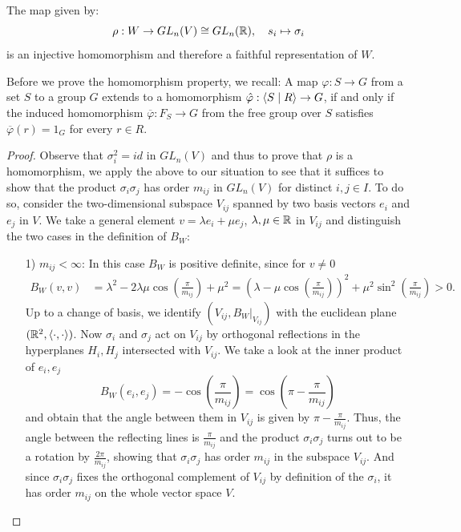 \begin{theorem}\label{thm:repr}
    The map given by:
    \[\rho : W \to GL_n(V) \cong GL_n(\mathbb{R}), \quad s_i \mapsto \sigma_i\]
    is an injective homomorphism and therefore a faithful representation of \(W\).
\end{theorem}
Before we prove the homomorphism property, we recall:
A map \(\varphi: S\to G\) from a set \(S\) to a group \(G\) extends to a homomorphism \(\Hat{\varphi}:\langle S\;\vert\;R\rangle\to G\), if and only if the induced homomorphism \(\overline{\varphi}:F_S \to G\) from the free group over \(S\) satisfies \(\overline{\varphi}(r) = 1_G\) for every \(r\in R\).
\begin{proof}
    Observe that \(\sigma_i^2 = id\) in \(GL_n(V)\) and thus to prove that \(\rho\) is a homomorphism, we apply the above to our situation to see that it suffices to show that the product \(\sigma_i\sigma_j\) has order \(m_{ij}\) in \(GL_n(V)\) for distinct \(i,j\in I\).
    To do so, consider the two-dimensional subspace \(V_{ij}\) spanned by two basis vectors \(e_i\) and \(e_j\) in \(V\).
    We take a general element \(v = \lambda e_i + \mu e_j\), \(\lambda,\mu\in\mathbb{R}\) in \(V_{ij}\) and distinguish the two cases in the definition of \(B_W\):
    \begin{itemize}
        \item[1)] \(m_{ij}<\infty\): In this case \(B_W\) is positive definite, since for \(v\neq 0\)
              \begin{align*}
                  B_W(v,v) & = \lambda^2 - 2\lambda\mu\cos\left(\frac{\pi}{m_{ij}}\right) + \mu^2
                  = \left( \lambda - \mu\cos\left( \frac{\pi}{m_{ij}} \right) \right)^2 + \mu^2\sin^2\left( \frac{\pi}{m_{ij}} \right) > 0.
              \end{align*}
              Up to a change of basis, we identify \((V_{ij}, B_W\vert_{V_{ij}})\) with the euclidean plane \((\mathbb{R}^2, \langle\cdot, \cdot\rangle)\).
              Now \(\sigma_i\) and \(\sigma_j\) act on \(V_{ij}\) by orthogonal reflections in the hyperplanes \(H_i, H_j\) intersected with \(V_{ij}\).
              We take a look at the inner product of \(e_i, e_j\)
              \[B_W(e_i, e_j) = -\cos\left(\frac{\pi}{m_{ij}}\right) = \cos\left(\pi - \frac{\pi}{m_{ij}}\right)\]
              and obtain that the angle between them in \(V_{ij}\) is given by \(\pi - \frac{\pi}{m_{ij}}\).
              Thus, the angle between the reflecting lines is \(\frac{\pi}{m_{ij}}\) and the product \(\sigma_i\sigma_j\) turns out to be a rotation by \(\frac{2\pi}{m_{ij}}\), showing that \(\sigma_i\sigma_j\) has order \(m_{ij}\) in the subspace \(V_{ij}\).
              And since \(\sigma_i\sigma_j\) fixes the orthogonal complement of \(V_{ij}\) by definition of the \(\sigma_i\), it has order \(m_{ij}\) on the whole vector space \(V\).


\end{itemize}
\end{proof}
